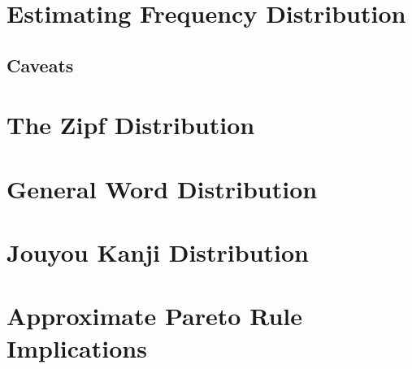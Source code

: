 \section{Estimating Frequency Distribution}
\subsection{Caveats}
\section{The Zipf Distribution}
\section{General Word Distribution}
\section{Jouyou Kanji Distribution}
\section{Approximate Pareto Rule Implications}